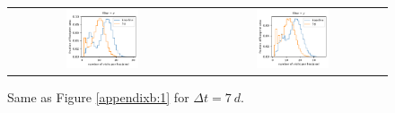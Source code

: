 \documentclass[preprintm,linenumbers]{aastex631}
\begin{document}
\begin{figure}
\begin{tabular}{c c}
				 \includegraphics[width=0.4\textwidth]{results/histograms/hist_first_year_one_snap_v4_0_10yrs_db_noDD_noTwi_CountMetric_doAllTemplateMetrics_reduceCount_z_7_noDD_noTwi.pdf} &
				\includegraphics[width=0.4\textwidth]{results/histograms/hist_first_year_one_snap_v4_0_10yrs_db_noDD_noTwi_CountMetric_doAllTemplateMetrics_reduceCount_y_7_noDD_noTwi.pdf} \\
    			
			\end{tabular}
			\caption{ Same as Figure \ref{appendixb:1} for $\Delta t = 7\ \si{d}$. \label{appendixb:2}}
		\end{figure}
\end{document}
